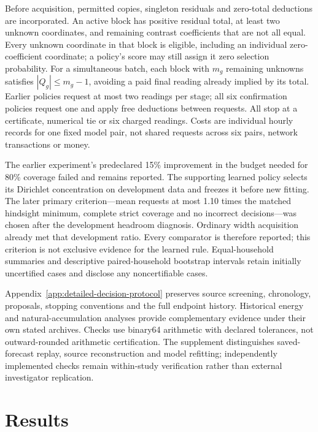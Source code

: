 \documentclass[12pt]{article}
\begin{document}
Before acquisition, permitted copies, singleton residuals and zero-total
deductions are incorporated. An active block has positive residual total,
at least two unknown coordinates, and remaining contrast coefficients
that are not all equal. Every unknown coordinate in that block is
eligible, including an individual zero-coefficient coordinate; a policy's
score may still assign it zero selection probability. For a simultaneous
batch, each block with $m_g$ remaining unknowns satisfies
$|Q_g|\leq m_g-1$, avoiding a paid final reading already implied by its
total. Earlier policies request at most two readings per stage; all six
confirmation policies request one and apply free deductions between
requests. All stop at a certificate, numerical tie or six charged
readings. Costs are individual hourly records for one fixed model pair,
not shared requests across six pairs, network transactions or money.

The earlier experiment's predeclared 15\% improvement in the budget
needed for 80\% coverage failed and remains reported. The supporting
learned policy selects its Dirichlet concentration on development data
and freezes it before new fitting. The later primary criterion---mean
requests at most 1.10 times the matched hindsight minimum, complete
strict coverage and no incorrect decisions---was chosen after the
development headroom diagnosis. Ordinary width acquisition already met
that development ratio. Every comparator is therefore reported; this
criterion is not exclusive evidence for the learned rule. Equal-household
summaries and descriptive paired-household bootstrap intervals retain
initially uncertified cases and disclose any noncertifiable cases.

Appendix~\ref{app:detailed-decision-protocol} preserves source screening,
chronology, proposals, stopping conventions and the full endpoint history.
Historical energy and natural-accumulation analyses provide complementary
evidence under their own stated archives. Checks use binary64 arithmetic
with declared tolerances, not outward-rounded arithmetic certification.
The supplement distinguishes saved-forecast replay, source reconstruction
and model refitting; independently implemented checks remain within-study
verification rather than external investigator replication.

\section{Results}
\end{document}
